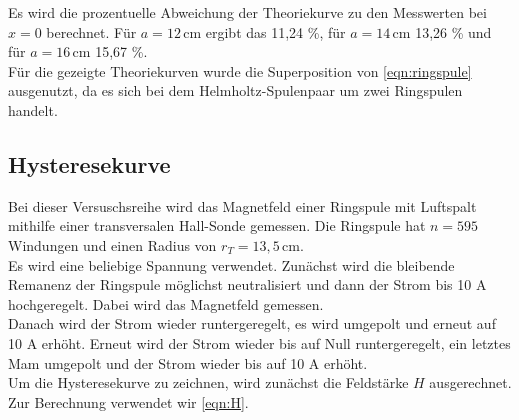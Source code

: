 Es wird die prozentuelle Abweichung der Theoriekurve zu den Messwerten bei $x=0$ berechnet.
Für $a=12 \, \unit{\cm}$ ergibt das 11,24 \%, für $a=14 \, \unit{\cm}$ 13,26 \% und für $a=16 \, \unit{\cm}$ 15,67 \%.\\
Für die gezeigte Theoriekurven wurde die Superposition von \autoref{eqn:ringspule} ausgenutzt, da es sich
bei dem Helmholtz-Spulenpaar um zwei Ringspulen handelt.\\

\subsection{Hysteresekurve}

Bei dieser Versuschsreihe wird das Magnetfeld einer Ringspule mit Luftspalt mithilfe einer
transversalen Hall-Sonde gemessen. Die Ringspule hat $n=595$ Windungen und einen Radius von $r_T=13,5 \, \unit{\cm}$. \\
Es wird eine beliebige Spannung verwendet. Zunächst wird 
die bleibende Remanenz der Ringspule möglichst neutralisiert und dann der Strom bis 10 A
hochgeregelt. Dabei wird das Magnetfeld gemessen.\\
Danach wird der Strom wieder runtergeregelt, es wird umgepolt und erneut auf 10 A erhöht.
Erneut wird der Strom wieder bis auf Null runtergeregelt, ein letztes Mam umgepolt und der Strom
wieder bis auf 10 A erhöht.\\
Um die Hysteresekurve zu zeichnen, wird zunächst die Feldstärke $H$ ausgerechnet. Zur Berechnung verwendet wir \autoref{eqn:H}.


